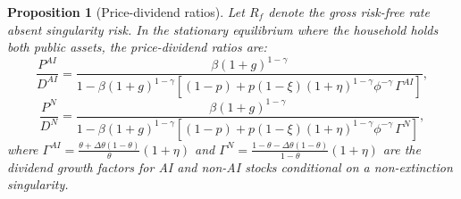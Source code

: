\documentclass[12pt]{article}
\newtheorem{proposition}{Proposition}
\begin{document}
\begin{proposition}[Price-dividend ratios] \label{prop:pd-ratios} %
Let $R_f$ denote the gross risk-free rate absent singularity risk. In the stationary equilibrium where the household holds both public assets, the price-dividend ratios are:
%
\begin{equation}
\frac{P^{AI}}{D^{AI}} = \frac{\beta (1+g)^{1-\gamma}}{1 - \beta(1+g)^{1-\gamma} \left[ (1-p) + p(1-\xi)(1+\eta)^{1-\gamma} \phi^{-\gamma} \, \Gamma^{AI} \right]}, \label{eq:pd-ai}
\end{equation}
%
\begin{equation}
\frac{P^{N}}{D^{N}} = \frac{\beta (1+g)^{1-\gamma}}{1 - \beta(1+g)^{1-\gamma} \left[ (1-p) + p(1-\xi)(1+\eta)^{1-\gamma} \phi^{-\gamma} \, \Gamma^{N} \right]}, \label{eq:pd-nonai}
\end{equation}
%
where $\Gamma^{AI} = \frac{\theta + \Delta\theta(1-\theta)}{\theta} (1+\eta)$ and $\Gamma^{N} = \frac{1 - \theta - \Delta\theta(1-\theta)}{1-\theta} (1+\eta)$ are the dividend growth factors for AI and non-AI stocks conditional on a non-extinction singularity.
\end{proposition}
\end{document}
